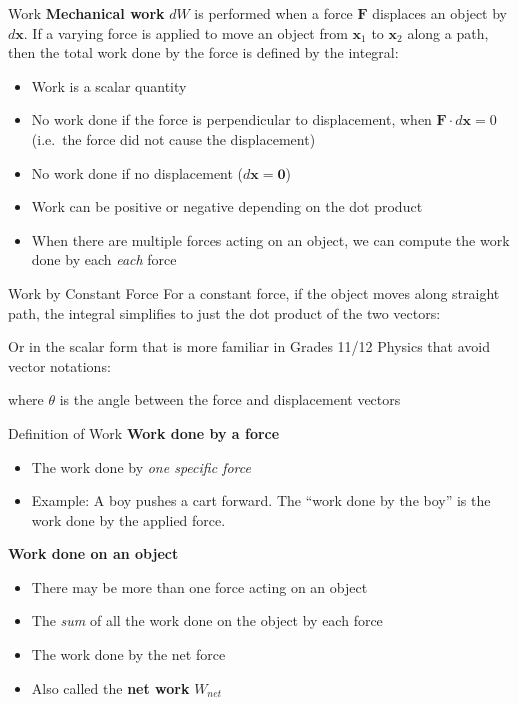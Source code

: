 \documentclass[12pt,compress,aspectratio=169]{beamer}
\newcommand{\eq}[2]{\vspace{#1}{\Large\begin{displaymath}#2\end{displaymath}}}
\begin{document}
\begin{frame}{Work}
  \textbf{Mechanical work} $dW$ is performed when a force $\bm{F}$ displaces an
  object by $d\bm{x}$. If a varying force
  is applied to move an object from $\bm{x}_1$ to $\bm{x}_2$ along a path, then
  the total work done by the force is defined by the integral:

  \eq{-.2in}{
    W=\int\bm{F}(\bm{x})\cdot d\bm{x}
  }

  \begin{itemize}
  \item Work is a scalar quantity
  \item No work done if the force is perpendicular to displacement, when
    $\bm{F}\cdot d\bm{x}=0$ (i.e.\ the force did not cause the displacement)
  \item No work done if no displacement ($d\bm{x}=\bm{0}$)
  \item Work can be positive or negative depending on the dot product
  \item When there are multiple forces acting on an object, we can compute the
    work done by each \emph{each} force
  \end{itemize}
\end{frame}



\begin{frame}{Work by Constant Force}
  For a constant force, if the object moves along straight path, the integral
  simplifies to just the dot product of the two vectors:

  \eq{-.2in}{
    \boxed{
      W=\bm{F}\cdot\Delta\bm{x}
    }
  }

  Or in the scalar form that is more familiar in Grades 11/12 Physics that
  avoid vector notations:

  \eq{-.2in}{
    \boxed{W=F\Delta x\cos\theta}
  }

  \vspace{-.1in}where $\theta$ is the angle between the force and displacement
  vectors
\end{frame}



\begin{frame}{Definition of Work}
  \textbf{Work done by a force}
  \begin{itemize}
  \item The work done by \emph{one specific force}
  \item Example: A boy pushes a cart forward. The ``work done by the boy'' is
    the work done by the applied force.
  \end{itemize}

  \vspace{.15in}\textbf{Work done on an object}
  \begin{itemize}
  \item There may be more than one force acting on an object
  \item The \emph{sum} of all the work done on the object by each force
  \item The work done by the net force
  \item Also called the \textbf{net work} $W_{net}$
  \end{itemize}
\end{frame}
\end{document}
